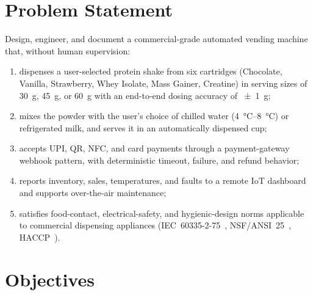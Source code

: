 \section{Problem Statement}
\label{sec:problem}

Design, engineer, and document a commercial-grade automated vending machine
that, without human supervision:

\begin{enumerate}[label=\textbf{P\arabic*.}, itemsep=2pt]
  \item dispenses a user-selected protein shake from six cartridges
        (Chocolate, Vanilla, Strawberry, Whey Isolate, Mass Gainer,
        Creatine) in serving sizes of \SI{30}{\gram}, \SI{45}{\gram}, or
        \SI{60}{\gram} with an end-to-end dosing accuracy of
        \SI{\pm 1}{\gram};
  \item mixes the powder with the user's choice of chilled water
        (\SIrange{4}{8}{\celsius}) or refrigerated milk, and serves it in an
        automatically dispensed cup;
  \item accepts UPI, QR, NFC, and card payments through a
        payment-gateway webhook pattern, with deterministic timeout,
        failure, and refund behavior;
  \item reports inventory, sales, temperatures, and faults to a remote IoT
        dashboard and supports over-the-air maintenance;
  \item satisfies food-contact, electrical-safety, and hygienic-design
        norms applicable to commercial dispensing appliances
        (IEC~60335-2-75~\cite{iec60335275}, NSF/ANSI~25~\cite{nsf25},
        HACCP~\cite{codexhaccp}).
\end{enumerate}

\section{Objectives}
\label{sec:objectives}

